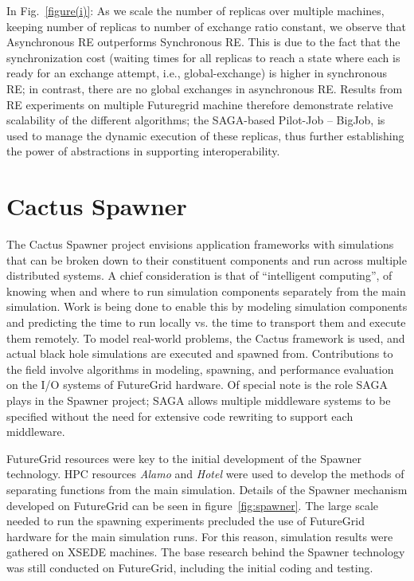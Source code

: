 \documentclass[]{paper}
\newcommand{\mrnote}[1]{ {\textcolor{cyan} { ***Melissa: #1 }}}
\newcommand{\mrnote}[1]{}
\begin{document}
In Fig.~\ref{figure(i)}: As we scale the number of replicas over multiple machines, keeping number of replicas to number of exchange ratio constant, we observe that Asynchronous RE outperforms Synchronous RE. This is due to the fact that the synchronization cost (waiting times for all replicas to reach a state where each is ready for an exchange attempt, i.e., global-exchange) is higher in synchronous RE; in contrast, there are no global exchanges in asynchronous RE.  Results from RE experiments on multiple Futuregrid machine therefore demonstrate relative scalability of the different algorithms; the SAGA-based Pilot-Job -- BigJob, is used to manage the dynamic execution of these replicas, thus further establishing the power of abstractions in supporting interoperability.


\section{Cactus Spawner}
The Cactus Spawner project envisions application frameworks with simulations that
can be broken down to their constituent components and run across multiple
distributed systems.  A chief consideration is that of ``intelligent computing'',
of knowing when and where to run simulation components separately from the main
simulation.  Work is being done to enable this by modeling simulation components
and predicting the time to run locally vs. the time to transport them and execute
them remotely.  To model real-world problems, the Cactus framework is used, and
actual black hole simulations are executed and spawned from.  Contributions
to the field involve algorithms in modeling, spawning, and performance evaluation on
the I/O systems of FutureGrid hardware.  Of special note is the role SAGA plays in the
Spawner project; SAGA allows multiple middleware systems to be specified without the need
for extensive code rewriting to support each middleware.

FutureGrid resources were key to the initial development of the Spawner technology.
HPC resources \textit{Alamo} and \textit{Hotel} were used to develop the methods of separating functions
from the main simulation. Details of the Spawner
mechanism developed on FutureGrid can be seen in figure~\ref{fig:spawner}.
The large scale needed to run the spawning experiments precluded the use
of FutureGrid hardware for the main simulation runs.   For this reason, simulation results were gathered
on XSEDE machines.  The base research behind the Spawner technology
was still conducted on FutureGrid, including the initial coding and testing.  
\end{document}
